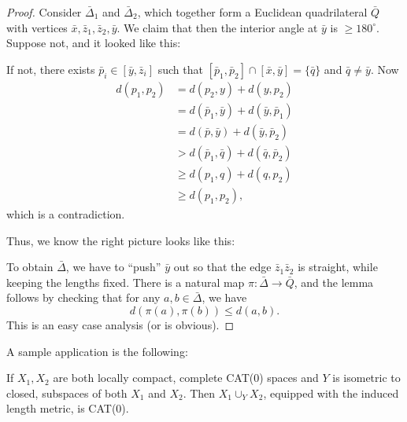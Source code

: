 \documentclass[a4paper]{article}
\begin{document}
\begin{proof}
  Consider $\bar{\Delta}_1$ and $\bar{\Delta}_2$, which together form a Euclidean quadrilateral $\bar{Q}$ with vertices $\bar{x}, \bar{z}_1, \bar{z}_2, \bar{y}$. We claim that then the interior angle at $\bar{y}$ is $\geq 180^\circ$. Suppose not, and it looked like this:
  \begin{center}
  \end{center}
  If not, there exists $\bar{p}_i \in [\bar{y}, \bar{z}_i]$ such that $[\bar{p}_1, \bar{p}_2] \cap [\bar{x}, \bar{y}] = \{\bar{q}\}$ and $\bar{q} \not= \bar{y}$. Now
  \begin{align*}
    d(p_1, p_2) &= d(p_2, y) + d(y, p_2) \\
    &= d(\bar{p}_1, \bar{y}) + d(\bar{y}, \bar{p}_1)\\
    &= d(\bar{p}, \bar{y}) + d(\bar{y}, \bar{p}_2)\\
    &> d(\bar{p}_1, \bar{q}) + d(\bar{q}, \bar{p}_2)\\
    &\geq d(p_1, q) + d(q, p_2)\\
    &\geq d(p_1, p_2),
  \end{align*}
  which is a contradiction.

  Thus, we know the right picture looks like this:
  \begin{center}
  \end{center}
  To obtain $\bar{\Delta}$, we have to ``push'' $\bar{y}$ out so that the edge $\bar{z}_1 \bar{z}_2$ is straight, while keeping the lengths fixed. There is a natural map $\pi: \bar{\Delta} \to \bar{Q}$, and the lemma follows by checking that for any $a, b \in \bar{\Delta}$, we have
  \[
    d(\pi(a), \pi(b)) \leq d(a, b).
  \]
  This is an easy case analysis (or is obvious).
\end{proof}

A sample application is the following:
\begin{prop}
  If $X_1, X_2$ are both locally compact, complete CAT(0) spaces and $Y$ is isometric to closed, subspaces of both $X_1$ and $X_2$. Then $X_1 \cup_Y X_2$, equipped with the induced length metric, is CAT(0).
\end{prop}
\end{document}
